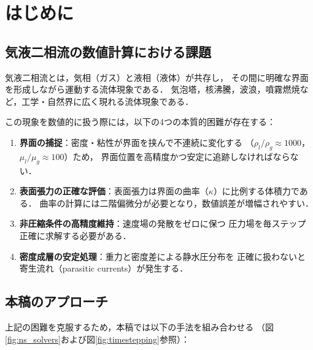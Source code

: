 \documentclass[12pt, a4paper, titlepage, xelatex, ja=standard]{bxjsarticle}
\begin{document}
\tableofcontents
\newpage

\section{はじめに}
\label{sec:intro}

\subsection{気液二相流の数値計算における課題}

気液二相流とは，気相（ガス）と液相（液体）が共存し，
その間に明確な界面を形成しながら運動する流体現象である．
気泡塔，核沸騰，波浪，噴霧燃焼など，工学・自然界に広く現れる流体現象である．

この現象を数値的に扱う際には，以下の4つの本質的困難が存在する：

\begin{enumerate}
  \item \textbf{界面の捕捉}：密度・粘性が界面を挟んで不連続に変化する
        （$\rho_l/\rho_g \approx 1000$，$\mu_l/\mu_g \approx 100$）ため，
        界面位置を高精度かつ安定に追跡しなければならない．
  \item \textbf{表面張力の正確な評価}：表面張力は界面の曲率（$\kappa$）に比例する体積力である．
        曲率の計算には二階偏微分が必要となり，数値誤差が増幅されやすい．
  \item \textbf{非圧縮条件の高精度維持}：速度場の発散をゼロに保つ
        圧力場を毎ステップ正確に求解する必要がある．
  \item \textbf{密度成層の安定処理}：重力と密度差による静水圧分布を
        正確に扱わないと寄生流れ（parasitic currents）が発生する．
\end{enumerate}

\subsection{本稿のアプローチ}

上記の困難を克服するため，本稿では以下の手法を組み合わせる
（図\ref{fig:ns_solvers}および図\ref{fig:timestepping}参照）：
\end{document}
